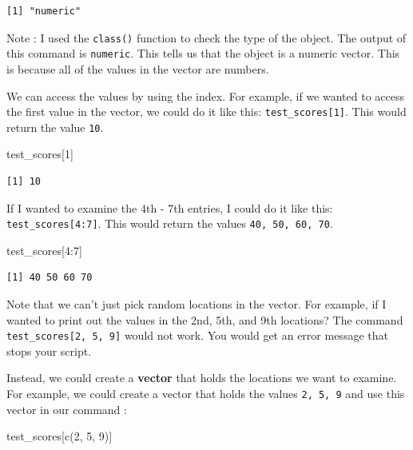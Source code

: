 \documentclass[
  letterpaper,
  DIV=11,
  numbers=noendperiod]{scrreprt}
\newenvironment{Shaded}{\begin{snugshade}}{\end{snugshade}}
\newcommand{\DecValTok}[1]{\textcolor[rgb]{0.68,0.00,0.00}{#1}}
\newcommand{\FunctionTok}[1]{\textcolor[rgb]{0.28,0.35,0.67}{#1}}
\newcommand{\NormalTok}[1]{\textcolor[rgb]{0.00,0.23,0.31}{#1}}
\newcommand{\SpecialCharTok}[1]{\textcolor[rgb]{0.37,0.37,0.37}{#1}}
\begin{document}
\begin{verbatim}
[1] "numeric"
\end{verbatim}

Note : I used the \texttt{class()} function to check the type of the
object. The output of this command is \texttt{numeric}. This tells us
that the object is a numeric vector. This is because all of the values
in the vector are numbers.

We can access the values by using the index. For example, if we wanted
to access the first value in the vector, we could do it like this:
\texttt{test\_scores{[}1{]}}. This would return the value \texttt{10}.

\begin{Shaded}
\begin{Highlighting}[]
\NormalTok{test\_scores[}\DecValTok{1}\NormalTok{]}
\end{Highlighting}
\end{Shaded}

\begin{verbatim}
[1] 10
\end{verbatim}

If I wanted to examine the 4th - 7th entries, I could do it like this:
\texttt{test\_scores{[}4:7{]}}. This would return the values
\texttt{40,\ 50,\ 60,\ 70}.

\begin{Shaded}
\begin{Highlighting}[]
\NormalTok{test\_scores[}\DecValTok{4}\SpecialCharTok{:}\DecValTok{7}\NormalTok{]}
\end{Highlighting}
\end{Shaded}

\begin{verbatim}
[1] 40 50 60 70
\end{verbatim}

Note that we can't just pick random locations in the vector. For
example, if I wanted to print out the values in the 2nd, 5th, and 9th
locations? The command \texttt{test\_scores{[}2,\ 5,\ 9{]}} would not
work. You would get an error message that stops your script.

Instead, we could create a \textbf{vector} that holds the locations we
want to examine. For example, we could create a vector that holds the
values \texttt{2,\ 5,\ 9} and use this vector in our command :

\begin{Shaded}
\begin{Highlighting}[]
\NormalTok{test\_scores[}\FunctionTok{c}\NormalTok{(}\DecValTok{2}\NormalTok{, }\DecValTok{5}\NormalTok{, }\DecValTok{9}\NormalTok{)]}
\end{Highlighting}
\end{Shaded}
\end{document}
